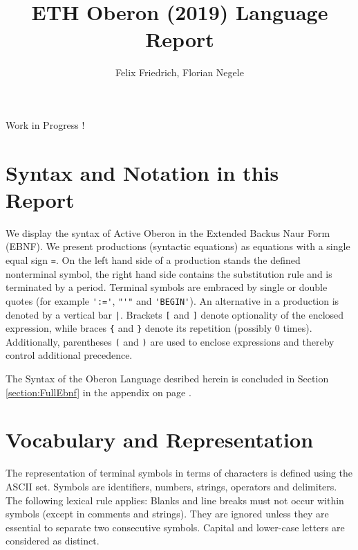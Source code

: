 \documentclass[a4wide,11pt]{article}
\begin{document}
\title{ETH Oberon (2019) Language Report}
\author{Felix Friedrich, Florian Negele}
\maketitle
{}

\begin{center}
Work in Progress !
\end{center}
\tableofcontents

\parskip 5pt
\parindent 0cm
\setlength\parindent{0pt}


\section{Syntax and Notation in this Report}\label{section:Syntax}
We display the syntax of Active Oberon in the Extended Backus Naur Form (EBNF).
We present productions (syntactic equations) as equations with a single equal sign \verb~=~.
On the left hand side of a production stands the defined nonterminal symbol, the right hand side contains the substitution rule and is terminated by a period.
Terminal symbols are embraced by single or double quotes (for example \verb~':='~, \verb~"'"~ and \verb~'BEGIN'~).
An alternative in a production is denoted by a vertical bar \verb~|~.
Brackets \verb~[~ and \verb~]~ denote optionality of the enclosed expression, while braces \verb~{~ and \verb~}~ denote its repetition (possibly 0 times).
Additionally, parentheses \verb~(~ and \verb~)~ are used to enclose expressions and thereby control additional precedence.

The Syntax of the Oberon Language desribed herein is concluded in Section \ref{section:FullEbnf} in the appendix on page \pageref{section:FullEbnf}.

\section{Vocabulary and Representation}
The representation of terminal symbols in terms of characters is defined using the ASCII set.
Symbols are identifiers, numbers, strings, operators and delimiters.
The following lexical rule applies: Blanks and line breaks must not occur within symbols (except in comments and strings).
They are ignored unless they are essential to separate two consecutive symbols.
Capital and lower-case letters are considered as distinct.
\end{document}
